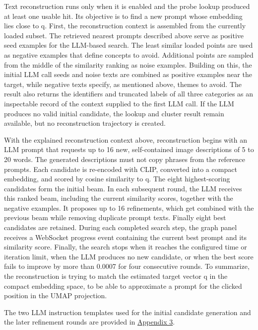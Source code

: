 Text reconstruction runs only when it is enabled and the probe lookup produced at least one usable hit. Its objective is to find a new prompt whose embedding lies close to q. First, the reconstruction context is assembled from the currently loaded subset. The retrieved nearest prompts described above serve as positive seed examples for the LLM-based search. The least similar loaded points are used as negative examples that define concepts to avoid. Additional points are sampled from the middle of the similarity ranking as noise examples. Building on this, the initial LLM call seeds and noise texts are combined as positive examples near the target, while negative texts specify, as mentioned above, themes to avoid. The result also returns the identifiers and truncated labels of all three categories as an inspectable record of the context supplied to the first LLM call. If the LLM produces no valid initial candidate, the lookup and cluster result remain available, but no reconstruction trajectory is created.

With the explained reconstruction context above, reconstruction begins with an LLM prompt that requests up to 16 new, self-contained image descriptions of 5 to 20 words. The generated descriptions must not copy phrases from the reference prompts. Each candidate is re-encoded with CLIP, converted into a compact embedding, and scored by cosine similarity to q. The eight highest-scoring candidates form the initial beam.
In each subsequent round, the LLM receives this ranked beam, including the current similarity scores, together with the negative examples. It proposes up to 16 refinements, which get combined with the previous beam while removing duplicate prompt texts. Finally eight best candidates are retained. During each completed search step, the graph panel receives a WebSocket progress event containing the current best prompt and its similarity score. Finally, the search stops when it reaches the configured time or iteration limit, when the LLM produces no new candidate, or when the best score fails to improve by more than 0.0007 for four consecutive rounds. To summarize, the reconstruction is trying to match the estimated target vector q in the compact embedding space, to be able to approximate a prompt for the clicked position in the UMAP projection.

The two LLM instruction templates used for the initial candidate generation and the later refinement rounds are provided in \hyperref[app:3-latent-probe]{Appendix 3}.

